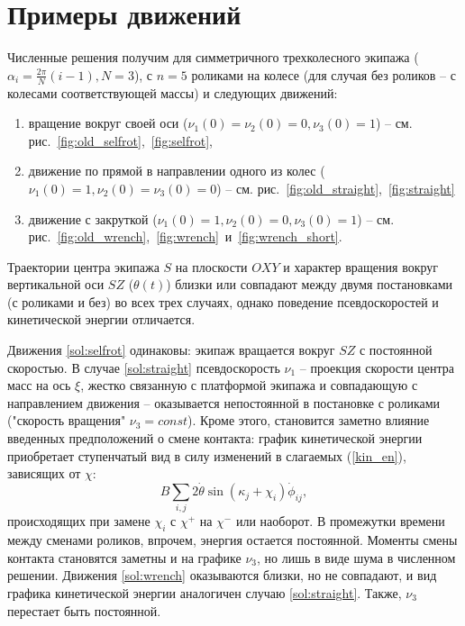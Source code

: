 \section{Примеры движений}

Численные решения получим для симметричного трехколесного экипажа ($\alpha_i = \frac{2\pi}{N}(i - 1), N = 3$), с $n = 5$ роликами на колесе (для случая без роликов -- с колесами соответствующей массы) и следующих движений:
\begin{enumerate}
  \item \label{sol:selfrot} вращение вокруг своей оси ($\nu_1(0) = \nu_2(0) = 0, \nu_3(0) = 1$) -- см. рис.~\ref{fig:old_selfrot},~\ref{fig:selfrot},
  \item \label{sol:straight} движение по прямой в направлении одного из колес ($\nu_1(0) = 1, \nu_2(0) = \nu_3(0) = 0$) -- см. рис.~\ref{fig:old_straight},~\ref{fig:straight}
  \item \label{sol:wrench} движение с закруткой ($\nu_1(0) = 1, \nu_2(0) = 0, \nu_3(0) = 1$) -- см. рис.~\ref{fig:old_wrench},~\ref{fig:wrench}~и~\ref{fig:wrench_short}.
\end{enumerate}

Траектории центра экипажа $S$ на плоскости $OXY$ и характер вращения вокруг вертикальной оси $SZ$ ($\theta(t)$) близки или совпадают между двумя постановками (с роликами и без) во всех трех случаях, однако поведение псевдоскоростей и кинетической энергии отличается.

Движения \ref{sol:selfrot} одинаковы: экипаж вращается вокруг $SZ$ с постоянной скоростью. В случае \ref{sol:straight} псевдоскорость $\nu_1$ -- проекция скорости центра масс на ось $\xi$, жестко связанную с платформой экипажа и совпадающую с направлением движения -- оказывается непостоянной в постановке с роликами ("скорость вращения" $\nu_3 = const$). Кроме этого, становится заметно влияние введенных предположений о смене контакта: график кинетической энергии приобретает ступенчатый вид в силу изменений в слагаемых (\ref{kin_en}), зависящих от $\chi$: 
$$B\sum_{i,j}2\dot{\theta}\sin(\kappa_j + \chi_i)\dot{\phi}_{ij},$$
происходящих при замене $\chi_i$ с $\chi^+$ на $\chi^-$ или наоборот. В промежутки времени между сменами роликов, впрочем, энергия остается постоянной. Моменты смены контакта становятся заметны и на графике $\nu_3$, но лишь в виде шума в численном решении. Движения \ref{sol:wrench} оказываются близки, но не совпадают, и вид графика кинетической энергии аналогичен случаю \ref{sol:straight}. Также, $\nu_3$ перестает быть постоянной.